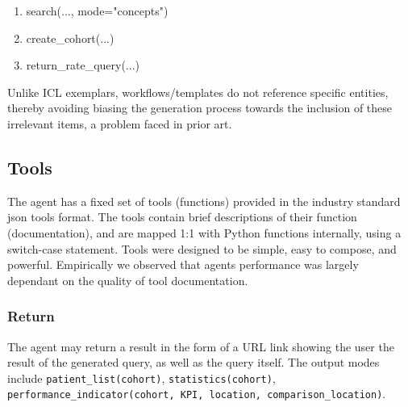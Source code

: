 \documentclass[11pt]{article}
\begin{document}
\begin{enumerate}
	\item search(..., mode="concepts")
	\item create\_cohort(...)
	\item return\_rate\_query(...)
\end{enumerate}

Unlike ICL exemplars, workflows/templates do not reference specific entities, thereby avoiding biasing the generation process towards the inclusion of these irrelevant items, a problem faced in prior art.

\subsection{Tools}
The agent has a fixed set of tools (functions) provided in the industry standard json tools format.
The tools contain brief descriptions of their function (documentation), and are mapped 1:1 with Python functions internally, using a switch-case statement.
Tools were designed to be simple, easy to compose, and powerful. Empirically we observed that agents performance was largely dependant on the quality of tool documentation.

\subsubsection{Return}
The agent may return a result in the form of a URL link showing the user the result of the generated query, as well as the query itself.
The output modes include \texttt{patient\_list(cohort)}, \texttt{statistics(cohort)}, \texttt{performance\_indicator(cohort, KPI, location, comparison\_location)}.
\end{document}
